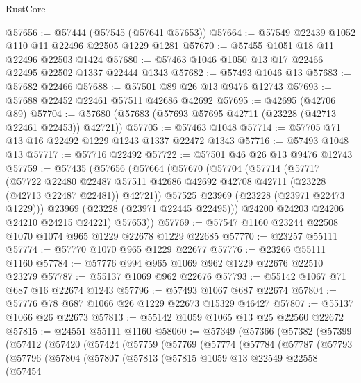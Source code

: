 \begin{lexlean}{RustCore}
\begin{coremodule}
@57656 := @57444 (@57545 (@57641 @57653))
@57664 := @57549 @22439 @1052 @110 @11 @22496 @22505 @1229 @1281
@57670 := @57455 @1051 @18 @11 @22496 @22503 @1424
@57680 := @57463 @1046 @1050 @13 @17 @22466 @22495 @22502 @1337 @22444 @1343
@57682 := @57493 @1046 @13
@57683 := @57682 @22466
@57688 := @57501 @89 @26 @13 @9476 @12743
@57693 := @57688 @22452 @22461 @57511 @42686 @42692
@57695 := @42695 (@42706 @89)
@57704 := @57680 (@57683 (@57693 @57695 @42711 (@23228 (@42713 @22461 @22453)) @42721))
@57705 := @57463 @1048
@57714 := @57705 @71 @13 @16 @22492 @1229 @1243 @1337 @22472 @1343
@57716 := @57493 @1048 @13
@57717 := @57716 @22492
@57722 := @57501 @46 @26 @13 @9476 @12743
@57759 := @57435
    (@57656
      (@57664
        (@57670
          (@57704
            (@57714
              (@57717
                (@57722
                  @22480
                  @22487
                  @57511
                  @42686
                  @42692
                  @42708
                  @42711
                  (@23228 (@42713 @22487 @22481))
                  @42721))
              @57525
              @23969
              (@23228 (@23971 @22473 @1229)))
            @23969
            (@23228 (@23971 @22445 @22495)))
          @24200
          @24203
          @24206
          @24210
          @24215
          @24221)
        @57653))
@57769 := @57547 @1160 @23244 @22508 @1070 @1074 @965 @1229 @22678 @1229 @22685
@57770 := @23257 @55111
@57774 := @57770 @1070 @965 @1229 @22677
@57776 := @23266 @55111 @1160
@57784 := @57776 @994 @965 @1069 @962 @1229 @22676 @22510 @23279
@57787 := @55137 @1069 @962 @22676
@57793 := @55142 @1067 @71 @687 @16 @22674 @1243
@57796 := @57493 @1067 @687 @22674
@57804 := @57776 @78 @687 @1066 @26 @1229 @22673 @15329 @46427
@57807 := @55137 @1066 @26 @22673
@57813 := @55142 @1059 @1065 @13 @25 @22560 @22672
@57815 := @24551 @55111 @1160
@58060 := @57349
    (@57366
      (@57382
        (@57399
          (@57412
            (@57420
              (@57424
                (@57759
                  (@57769
                    (@57774
                      (@57784
                        (@57787
                          (@57793
                            (@57796
                              (@57804
                                (@57807
                                  (@57813
                                    (@57815
                                      @1059
                                      @13
                                      @22549
                                      @22558
                                      (@57454

\end{coremodule}
\end{lexlean}
